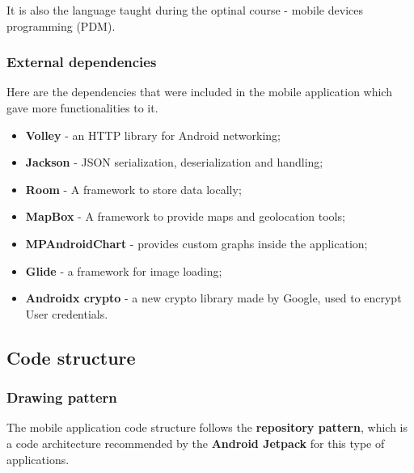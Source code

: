 It is also the language taught during the optinal course - mobile devices programming (PDM).\\

\subsubsection{External dependencies}

Here are the dependencies that were included in the mobile application which gave more functionalities to it.

\begin{itemize}
    \item \textbf{Volley} - an HTTP library for Android networking;
    \item \textbf{Jackson} - JSON serialization, deserialization and handling;
    \item \textbf{Room} - A framework to store data locally;
    \item \textbf{MapBox} - A framework to provide maps and geolocation tools;
    \item \textbf{MPAndroidChart} - provides custom graphs inside the application;
    \item \textbf{Glide} - a framework for image loading;
    \item \textbf{Androidx crypto} - a new crypto library made by Google, used to encrypt User credentials.
\end{itemize}

\subsection{Code structure}

\subsubsection{Drawing pattern}

The mobile application code structure follows the \textbf{repository pattern}, which is a code architecture recommended by the \textbf{Android Jetpack}\cite{jetpack} for this type of applications.\\

